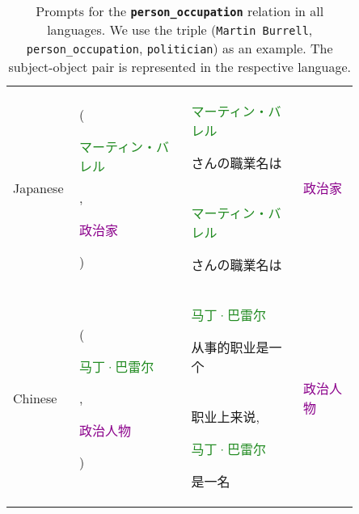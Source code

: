 \begin{table*}[htbp]
\begin{center}
\begin{tabular}{m{0.10\linewidth} p{0.30\linewidth} p{0.30\linewidth} m{0.15\linewidth}}
    & \\
\midrule
\multirow{2}{*}{\centering Japanese}
    & \multirow{2}{*}{\raggedright (\textcolor{forestgreen}{\begin{CJK}{UTF8}{min}マーティン・バレル\end{CJK}}, \textcolor{darkmagenta}{\begin{CJK}{UTF8}{min}政治家\end{CJK}})}
    & \textcolor{forestgreen}{\begin{CJK}{UTF8}{min}マーティン・バレル\end{CJK}}\begin{CJK}{UTF8}{min}さんの職業名は\end{CJK}
    & \multirow{2}{*}{\centering \textcolor{darkmagenta}{\begin{CJK}{UTF8}{min}政治家\end{CJK}}} \\
    & 
    & \textcolor{forestgreen}{\begin{CJK}{UTF8}{min}マーティン・バレル\end{CJK}}\begin{CJK}{UTF8}{min}さんの職業名は\end{CJK}
    & \\
\midrule
\multirow{2}{*}{\centering Chinese}
    & \multirow{2}{*}{\raggedright (\textcolor{forestgreen}{\begin{CJK}{UTF8}{gbsn}马丁·巴雷尔\end{CJK}}, \textcolor{darkmagenta}{\begin{CJK}{UTF8}{gbsn}政治人物\end{CJK}})}
    & \textcolor{forestgreen}{\begin{CJK}{UTF8}{gbsn}马丁·巴雷尔\end{CJK}}\begin{CJK}{UTF8}{gbsn}从事的职业是一个\end{CJK}
    & \multirow{2}{*}{\centering \textcolor{darkmagenta}{\begin{CJK}{UTF8}{gbsn}政治人物\end{CJK}}} \\
    & 
    & \begin{CJK}{UTF8}{gbsn}职业上来说, \end{CJK}\textcolor{forestgreen}{\begin{CJK}{UTF8}{gbsn}马丁·巴雷尔\end{CJK}}\begin{CJK}{UTF8}{gbsn}是一名\end{CJK}
    & \\
\bottomrule
\end{tabular}
\end{center}
\caption{Prompts for the \textbf{\texttt{person\_occupation}} relation in all languages. We use the triple (\texttt{Martin Burrell}, \texttt{person\_occupation}, \texttt{politician}) as an example. The subject-object pair is represented in the respective language.}
\label{tab:prompts_person_occupation}
\end{table*}


